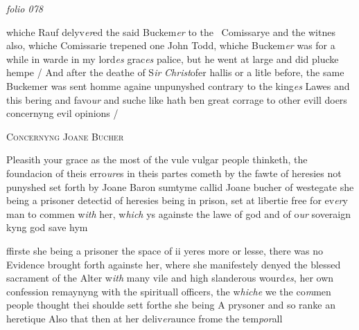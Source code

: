 \documentclass[12pt, a4paper]{book}
\begin{document}
\dotfill
						\newpage
{}

\textit{folio 078}


	
		\ifthenelse{\isodd{\thepage}}
		{\reversemarginpar}
		{\normalmarginpar}
		whiche Rauf delyv\textit{er}ed the said Buckem\textit{er} to the 
 Comissarye and the witnes also, whiche
 Comissarie trepened one John Todd, whiche
 Buckem\textit{er} was for a while in warde in my lord\textit{es}
 grac\textit{es} palice, but he went at large and did plucke
 hempe / And after the deathe of S\textit{ir}
                  \textit{Christ}ofer hallis
 or a litle before, the same Buckemer was sent homme
 againe unpunyshed contrary to the king\textit{es} Lawes
 and this bering and favo\textit{ur} and suche like hath ben
 great corrage to other evill doers concernyng evil
 opinions /
 

            
            
            	
				\begin{center} \begin{large} {\scshape Concernyng Joane Bucher} \end{large} \end{center}
			
            	
            		
			
            		
				\marginpar[\vspace{0.5cm}{\textcolor{Gray}{the pardon n}}]{}
			
            		
		\ifthenelse{\isodd{\thepage}}
		{\reversemarginpar}
		{\normalmarginpar}
		Pleasith your grace as the most of the vule
  vulgar people thinketh, the foundacion of theis
 erro\textit{ure}s in theis partes cometh by the fawte of
 heresies not punyshed set forth by Joane Baron
            			sumtyme callid Joane bucher of westegate she being
 a prisoner detectid of heresies being in prison, set
  at libertie free for ev\textit{er}y man to commen w\textit{ith} her, w\textit{hich}
  ys againste the lawe of god and of o\textit{ur} soveraign kyng
 god save hym
            	
            		
				\marginpar[\vspace{0.5cm}{\textcolor{Gray}{n}}]{}
			
            		
		\ifthenelse{\isodd{\thepage}}
		{\reversemarginpar}
		{\normalmarginpar}
		ffirste she being a prisoner the space of ii yeres
 more or lesse, there was no Evidence brought
 forth againste her, where she manifestely denyed
 the blessed sacrament of the Alter w\textit{ith} many vile
 and high slanderous wourd\textit{es}, her own confession
 remaynyng with the spirituall officers, the w\textit{hiche}
  we the co\textit{m}men people thought thei shoulde sett forthe
 she being A prysoner and so ranke an heretique
 Also that then at her deliv\textit{er}aunce frome the tem\textit{por}all
\end{document}
